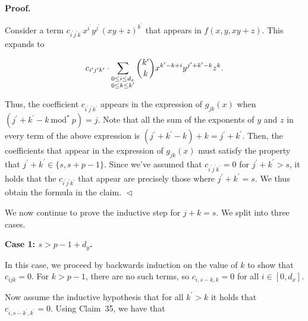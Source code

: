 \par\medskip\noindent\textbf{
\textbf{Proof}.}\par




Consider a term $c_{i^{\prime}j^{\prime}k^{\prime}}x^{i^{\prime}}y^{j^{\prime}}(xy+z)^{k^{\prime}}$ that appears in $f(x,y,xy+z)$. This expands to\par


\[\begin{gathered}
c_{i^{\prime}j^{\prime}k^{\prime}}\cdot\sum_{\begin{subarray}{c}0\leq i\leq d_{x}\\
0\leq k\leq k^{\prime}\end{subarray}}\binom{k^{\prime}}{k}x^{k^{\prime}-k+i}y^{j^{\prime}+k^{\prime}-k}z^{k}.
\end{gathered}\]


Thus, the coefficient $c_{i^{\prime}j^{\prime}k^{\prime}}$ appears in the expression of $g_{jk}(x)$ when $(j^{\prime}+k^{\prime}-k\ \text{mod}^{*}\ p)=j$. Note that all the sum of the exponents of $y$ and $z$ in every term of the above expression is $(j^{\prime}+k^{\prime}-k)+k=j^{\prime}+k^{\prime}$. Then, the coefficients that appear in the expression of $g_{jk}(x)$ must satisfy the property that $j^{\prime}+k^{\prime}\in\{s,s+p-1\}$. Since we’ve assumed that $c_{i^{\prime}j^{\prime}k^{\prime}}=0$ for $j^{\prime}+k^{\prime}>s$, it holds that the $c_{i^{\prime}j^{\prime}k^{\prime}}$ that appear are precisely those where $j^{\prime}+k^{\prime}=s$. We thus obtain the formula in the claim.
$\vartriangleleft$\par




We now continue to prove the inductive step for $j+k=s$. We split into three cases.\par





\par\medskip\noindent\textbf{Case 1: $s>p-1+d_{y}$.}\par




In this case, we proceed by backwards induction on the value of $k$ to show that $c_{ijk}=0$. For $k>p-1$, there are no such terms, so $c_{i,s-k,k}=0$ for all $i\in[0,d_{x}]$.\par




Now assume the inductive hypothesis that for all $k^{\prime}>k$ it holds that $c_{i,s-k^{\prime},k^{\prime}}=0$. Using Claim 35, we have that\par


